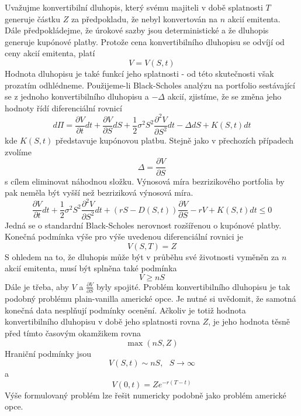 \documentclass[a4paper]{book}
\begin{document}
Uvažujme konvertibilní dluhopis, který svému majiteli v době splatnosti $T$ generuje částku $Z$ za předpokladu, že nebyl konvertován na $n$ akcií emitenta. Dále předpokládejme, že úrokové sazby jsou deterministické a že dluhopis generuje kupónové platby. Protože cena konvertibilního dluhopisu se odvíjí od ceny akcií emitenta, platí
\begin{equation*}
V = V(S,t)
\end{equation*}
Hodnota dluhopisu je také funkcí jeho splatnosti - od této skutečnosti však prozatím odhlédneme. Použijeme-li Black-Scholes analýzu na portfolio sestávající se z jednoho konvertibilního dluhopisu a $-\Delta$ akcií, zjistíme, že se změna jeho hodnoty řídí diferenciální rovnicí
\begin{equation*}
d \Pi = \frac{\partial V}{\partial t}dt + \frac{\partial V}{\partial S}dS + \frac{1}{2} \sigma^2 S^2 \frac{\partial^2 V}{\partial S^2}dt - \Delta dS + K(S,t)dt
\end{equation*}
kde $K(S,t)$ představuje kupónovou platbu. Stejně jako v přechozích případech zvolíme
\begin{equation*}
\Delta = \frac{\partial V}{\partial S}
\end{equation*}
s cílem eliminovat náhodnou složku. Výnosová míra bezrizikového portfolia by pak neměla být vyšší než bezriziková výnosová míra.
\begin{equation*}
\frac{\partial V}{\partial t}dt + \frac{1}{2} \sigma^2 S^2 \frac{\partial^2 V}{\partial S^2}dt + (rS - D(S,t))\frac{\partial V}{\partial S} - rV + K(S,t)dt \le 0
\end{equation*}
Jedná se o standardní Black-Scholes nerovnost rozšířenou o kupónové platby. Konečná podmínka výše pro výše uvedenou diferenciální rovnici je
\begin{equation*}
V(S,T) = Z
\end{equation*}
S ohledem na to, že dluhopis může být v průběhu své životnosti vyměněn za $n$ akcií emitenta, musí být splněna také podmínka
\begin{equation*}
V \ge nS
\end{equation*}
Dále je třeba, aby $V$ a $\frac{\partial V}{\partial S}$ byly spojité. Problém konvertibilního dluhopisu je tak podobný problému plain-vanilla americké opce. Je nutné si uvědomit, že samotná konečná data nesplňují podmínky ocenění. Ačkoliv je totiž hodnota konvertibilního dluhopisu v době jeho splatnosti rovna $Z$, je jeho hodnota těsně před tímto časovým okamžikem rovna
\begin{equation*}
\max(nS, Z)
\end{equation*}
Hraniční podmínky jsou
\begin{equation*}
V(S,t) \sim nS, ~~~ S \rightarrow \infty
\end{equation*}
a
\begin{equation*}
V(0,t) = Ze^{-r(T-t)}
\end{equation*}
Výše formulovaný problém lze řešit numericky podobně jako problém americké opce.
\end{document}

